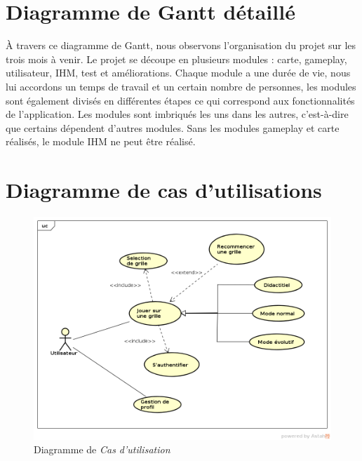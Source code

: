 \documentclass{report}
\begin{document}
    \section{Diagramme de Gantt détaillé}
   
     À travers ce diagramme de Gantt, nous observons l'organisation du projet sur les trois mois à venir. Le projet se découpe en plusieurs modules : carte, gameplay, utilisateur, IHM, test et améliorations.
    Chaque module a une durée de vie, nous lui accordons un temps de travail et un certain nombre de personnes, les modules sont également divisés en différentes étapes ce qui correspond aux fonctionnalités de l'application. Les modules sont imbriqués les uns dans les autres, c'est-à-dire que certains dépendent d'autres modules. Sans les modules gameplay et carte réalisés, le module IHM ne peut être réalisé. 
    
    \section{Diagramme de cas d'utilisations}
      
    \begin{figure}[H]
	\caption{Diagramme de \textit{Cas d’utilisation}}
	\includegraphics[width=17cm]{../UML/UseCase_diagram/UseCase1.png}
    \end{figure}
    
\end{document}
